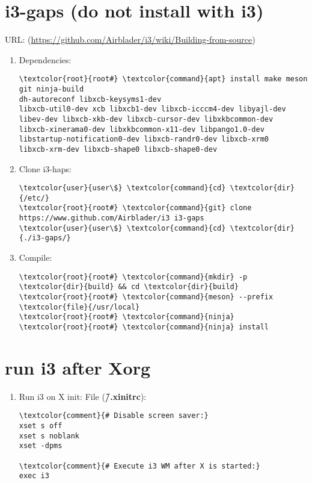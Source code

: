 \documentclass[10pt, a4paper, onecolumn, openany]{book} %
\begin{document}
\section{i3-gaps (do not install with i3)}
URL: (\underline{https://github.com/Airblader/i3/wiki/Building-from-source})
\begin{enumerate}
    \item Dependencies:
\begin{Verbatim}[commandchars=\\\{\}]
\textcolor{root}{root#} \textcolor{command}{apt} install make meson git ninja-build
dh-autoreconf libxcb-keysyms1-dev
libxcb-util0-dev xcb libxcb1-dev libxcb-icccm4-dev libyajl-dev
libev-dev libxcb-xkb-dev libxcb-cursor-dev libxkbcommon-dev 
libxcb-xinerama0-dev libxkbcommon-x11-dev libpango1.0-dev
libstartup-notification0-dev libxcb-randr0-dev libxcb-xrm0 
libxcb-xrm-dev libxcb-shape0 libxcb-shape0-dev
\end{Verbatim} 
    \item Clone i3-haps:
\begin{Verbatim}[commandchars=\\\{\}]
\textcolor{user}{user\$} \textcolor{command}{cd} \textcolor{dir}{/etc/}
\textcolor{root}{root#} \textcolor{command}{git} clone https://www.github.com/Airblader/i3 i3-gaps
\textcolor{user}{user\$} \textcolor{command}{cd} \textcolor{dir}{./i3-gaps/}
\end{Verbatim}
    \item Compile:
\begin{Verbatim}[commandchars=\\\{\}]
\textcolor{root}{root#} \textcolor{command}{mkdir} -p \textcolor{dir}{build} && cd \textcolor{dir}{build}
\textcolor{root}{root#} \textcolor{command}{meson} --prefix \textcolor{file}{/usr/local}
\textcolor{root}{root#} \textcolor{command}{ninja}
\textcolor{root}{root#} \textcolor{command}{ninja} install
\end{Verbatim}
\end{enumerate}
\section{run i3 after Xorg}
\begin{enumerate}
    \item Run i3 on X init:
\newline File (\textbf{\textcolor{file}{\~/.xinitrc}}):
\begin{Verbatim}[commandchars=\\\{\}]
\textcolor{comment}{# Disable screen saver:}
xset s off
xset s noblank
xset -dpms

\textcolor{comment}{# Execute i3 WM after X is started:}
exec i3
\end{Verbatim}
\end{enumerate}
\end{document}
